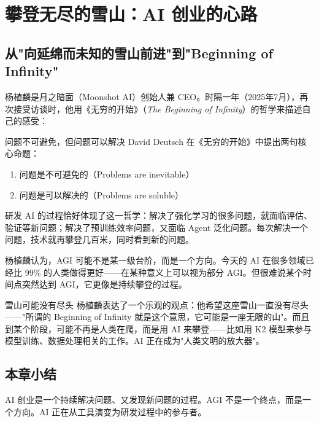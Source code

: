 \section{攀登无尽的雪山：AI 创业的心路}

\subsection{从"向延绵而未知的雪山前进"到"Beginning of Infinity"}

杨植麟是月之暗面（Moonshot AI）创始人兼 CEO。时隔一年（2025年7月），再次接受访谈时，他用《无穷的开始》（\textit{The Beginning of Infinity}）的哲学来描述自己的感受：

\begin{importantbox}{问题不可避免，但问题可以解决}
David Deutsch 在《无穷的开始》中提出两句核心命题：
\begin{enumerate}
    \item 问题是不可避免的（Problems are inevitable）
    \item 问题是可以解决的（Problems are soluble）
\end{enumerate}
研发 AI 的过程恰好体现了这一哲学：解决了强化学习的很多问题，就面临评估、验证等新问题；解决了预训练效率问题，又面临 Agent 泛化问题。每次解决一个问题，技术就再攀登几百米，同时看到新的问题。
\end{importantbox}

杨植麟认为，AGI 可能不是某一级台阶，而是一个方向。今天的 AI 在很多领域已经比 99\% 的人类做得更好——在某种意义上可以视为部分 AGI。但很难说某个时间点突然达到 AGI，它更像是持续攀登的过程。

\begin{knowledgebox}{雪山可能没有尽头}
杨植麟表达了一个乐观的观点：他希望这座雪山一直没有尽头——"所谓的 Beginning of Infinity 就是这个意思，它可能是一座无限的山"。而且到某个阶段，可能不再是人类在爬，而是用 AI 来攀登——比如用 K2 模型来参与模型训练、数据处理相关的工作。AI 正在成为"人类文明的放大器"。
\end{knowledgebox}

\subsection{本章小结}

AI 创业是一个持续解决问题、又发现新问题的过程。AGI 不是一个终点，而是一个方向。AI 正在从工具演变为研发过程中的参与者。


